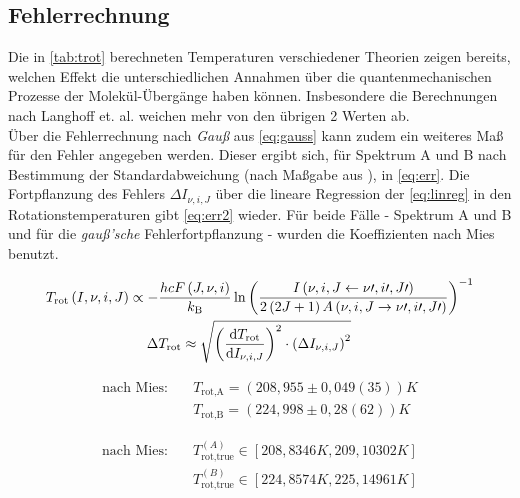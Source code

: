 \documentclass[numbers=noenddot,a4paper,notitlepage,twoside,BCOR15mm]{scrartcl}
\newcommand{\diff}{\textnormal{d}}
\newcommand{\ix}[1]{_\text{#1}}
\newcommand{\tilt}[1]{\textit{#1}}
\begin{document}
		\subsection{Fehlerrechnung}


			Die in \autoref{tab:trot} berechneten Temperaturen verschiedener Theorien zeigen bereits, welchen Effekt die unterschiedlichen Annahmen über die quantenmechanischen Prozesse der Molekül-Übergänge haben können. Insbesondere die Berechnungen nach Langhoff et. al. weichen mehr von den übrigen 2 Werten ab.\\
			Über die Fehlerrechnung nach \tilt{Gauß} aus \autoref{eq:gauss} kann zudem ein weiteres Maß für den Fehler angegeben werden. Dieser ergibt sich, für Spektrum A und B nach Bestimmung der Standardabweichung (nach Maßgabe aus \cite{EMAUGreifswaldOHRot}), in \autoref{eq:err}. Die Fortpflanzung des Fehlers $\Delta I_{\nu,i,J}$ über die lineare Regression der \autoref{eq:linreg} in den Rotationstemperaturen gibt \autoref{eq:err2} wieder. Für beide Fälle - Spektrum A und B und für die \tilt{gauß'sche} Fehlerfortpflanzung - wurden die Koeffizienten nach Mies benutzt.

				\begin{align}
					T\ix{rot}\left(I,\nu,i,J\right)\propto-&\frac{hcF\left(J,\nu,i\right)}{k\ix{B}}\ln\left(\frac{I\left(\nu,i,J\leftarrow\nu\prime,i\prime,J\prime\right)}{2\left(2J+1\right)A\left(\nu,i,J\rightarrow\nu\prime,i\prime,J\prime\right)}\right)^{-1} \\
					\Delta& T\ix{rot}\approx\sqrt{\left(\frac{\diff T\ix{rot}}{\diff I_{\nu,i,J}}\right)^2\cdot\left(\Delta I_{\nu,i,J}\right)^2} \label{eq:gauss}
				\end{align}

				\begin{align}
					\text{nach Mies:} \quad &T\ix{rot,A}=\left(208,955\pm 0,049(35)\right)\unit{K} \label{eq:err}\\
					&T\ix{rot,B}=\left(224,998\pm 0,28(62)\right)\unit{K} \nonumber
				\end{align}

				\begin{align}
					\text{nach Mies:} \quad &T^{(A)}\ix{rot,true}\in\left[208,8346\unit{K},209,10302\unit{K}\right]  \label{eq:err2}\\
					&T^{(B)}\ix{rot,true}\in\left[224,8574\unit{K},225,14961\unit{K}\right] \nonumber
				\end{align}
\end{document}

